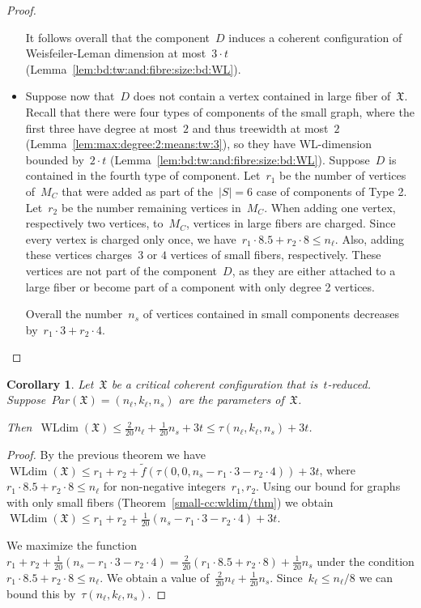 \documentclass[english,a4paper]{article}
\theoremstyle{plain}
\newtheorem{corollary}  [theorem]{Corollary}
\theoremstyle{definition}
\newcommand{\coherentConfig}{\ensuremath{\mathfrak{X}}}
\DeclareMathOperator*{\WLdim}{WLdim}
\newcommand{\wldim}[1]{\ensuremath{\WLdim\left(#1\right)}}
\newcommand{\f}{f}
\begin{document}
\begin{proof}
\begin{itemize}
        It follows overall that the component~$D$ induces a coherent configuration of Weisfeiler-Leman dimension at most~$3\cdot t$ (Lemma~\ref{lem:bd:tw:and:fibre:size:bd:WL}).

        \item
        Suppose now that~$D$ does not contain a vertex contained in large fiber of~$\coherentConfig$. Recall that there were four types of components of the small graph, where the first three have degree at most~$2$ and thus treewidth at most~$2$ (Lemma~\ref{lem:max:degree:2:means:tw:3}), so they have WL-dimension bounded by~$2 \cdot t$ (Lemma~\ref{lem:bd:tw:and:fibre:size:bd:WL}). Suppose~$D$ is contained in the fourth type of component.
        Let~$r_1$ be the number of vertices of~$M_C$ that were added as part of the~$|S|=6$ case of components of Type 2. Let~$r_2$ be the number remaining vertices in~$M_C$.
        When adding one vertex, respectively two vertices, to~$M_C$, vertices in large fibers are charged. Since every vertex is charged only once, we have~$r_1\cdot 8.5 +r_2\cdot 8\leq n_\ell$.
        Also, adding these vertices charges~$3$ or $4$ vertices of small fibers, respectively.
        These vertices are not part of the component~$D$, as they are either attached to a large fiber or become part of a component with only degree 2 vertices.

        Overall the number~$n_s$ of vertices contained in small components decreases by~$r_1\cdot 3 + r_2\cdot 4$.\qedhere
    \end{itemize}
\end{proof}


\begin{corollary}
\label{cor:of:main:global}
    Let~$\coherentConfig$ be a critical coherent configuration that is~$t$-reduced. Suppose~$Par(\coherentConfig)=(n_\ell, k_\ell,n_s)$ are the parameters of~$\coherentConfig$.

    Then~$\wldim{\coherentConfig}\leq \frac{2}{20} n_\ell + \frac{1}{20}n_s+3t\leq \tau(n_\ell, k_\ell,n_s) + 3t$.
\end{corollary}
\begin{proof}
    By the previous theorem we have~$\wldim{\coherentConfig}\leq r_1+r_2+ \widetilde{\f}(\tau(0,0,n_s-r_1\cdot 3 - r_2\cdot 4)) +3t$, where~$r_1\cdot 8.5 +r_2\cdot 8\leq n_\ell$ for non-negative integers~$r_1,r_2$.
    Using our bound for graphs with only small fibers (Theorem~\ref{small-cc:wldim/thm}) we obtain~$\wldim{\coherentConfig}
    \leq r_1+r_2+ \frac{1}{20} (n_s-  r_1\cdot 3 - r_2\cdot 4) +3t$.

    We maximize the function~$ r_1+r_2 + \frac{1}{20} (n_s-  r_1\cdot 3 - r_2\cdot 4) = \frac{2}{20} (r_1\cdot 8.5  + r_2\cdot 8) + \frac{1}{20} n_s$ under the condition $r_1\cdot 8.5 +r_2\cdot 8\leq n_\ell$.
    We obtain a value of~$\frac{2}{20} n_\ell + \frac{1}{20} n_s$. Since~$k_\ell\leq n_\ell/8$ we can bound this by~$\tau(n_\ell, k_\ell,n_s)$.
\end{proof}
\end{document}
